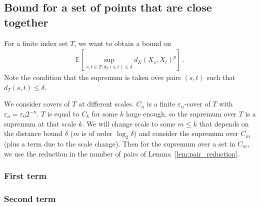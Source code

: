 



\subsection{Bound for a set of points that are close together}

For a finite index set $T$, we want to obtain a bound on
\begin{align*}
  \mathbb{E}\left[ \sup_{s, t \in T; d_T(s, t) \le \delta} d_E(X_s, X_t)^p \right] \: .
\end{align*}
Note the condition that the supremum is taken over pairs $(s, t)$ such that $d_T(s, t) \le \delta$.

We consider covers of $T$ at different scales. $C_n$ is a finite $\varepsilon_n$-cover of $T$ with $\varepsilon_n = \varepsilon_0 2^{-n}$.
$T$ is equal to $C_k$ for some $k$ large enough, so the supremum over $T$ is a supremum at that scale $k$.
We will change scale to some $m \le k$ that depends on the distance bound $\delta$ ($m$ is of order $\log_2 \delta$) and consider the supremum over $C_m$ (plus a term due to the scale change).
Then for the supremum over a set in $C_m$, we use the reduction in the number of pairs of Lemma~\ref{lem:pair_reduction}.










\subsubsection{First term}










\subsubsection{Second term}







